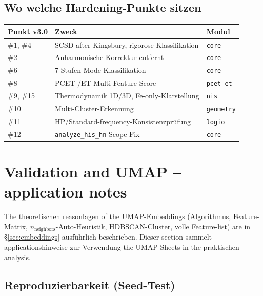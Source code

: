 \documentclass[11pt,a4paper,twoside]{article}
\theoremstyle{remark}
\begin{document}
\subsection{Wo welche Hardening-Punkte sitzen}

\begin{center}
\begin{tabularx}{\textwidth}{l X l}
\toprule
\textbf{Punkt v3.0} & \textbf{Zweck} & \textbf{Modul} \\
\midrule
\#1, \#4 & SCSD after Kingsbury, rigorose Klassifikation
                                & \texttt{core} \\
\#2      & Anharmonische Korrektur entfernt
                                & \texttt{core} \\
\#6      & 7-Stufen-Mode-Klassifikation
                                & \texttt{core} \\
\#8      & PCET-/ET-Multi-Feature-Score
                                & \texttt{pcet\_et} \\
\#9, \#15 & Thermodynamik 1D/3D, Fe-only-Klarstellung
                                & \texttt{nis} \\
\#10     & Multi-Cluster-Erkennung
                                & \texttt{geometry} \\
\#11     & HP/Standard-frequency-Konsistenzpr\"ufung
                                & \texttt{logio} \\
\#12     & \texttt{analyze\_his\_hn} Scope-Fix
                                & \texttt{core} \\
\bottomrule
\end{tabularx}
\end{center}

\section{Validation and UMAP -- application notes}

The theoretischen reasonlagen of the UMAP-Embeddings (Algorithmus,
Feature-Matrix, $n_\text{neighbors}$-Auto-Heuristik, HDBSCAN-Cluster,
volle Feature-list) are in \S\ref{sec:embeddings} ausf\"uhrlich
beschrieben. Dieser section sammelt applicationshinweise zur
Verwendung the UMAP-Sheets in the praktischen analysis.

\subsection{Reproduzierbarkeit (Seed-Test)}
\end{document}

